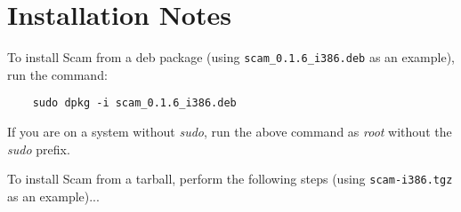 \documentclass{article}
\begin{document}
%
%


\section*{Installation Notes}

To install Scam from a deb package
(using {\tt scam\_0.1.6\_i386.deb} as an example), run the command:

\begin{verbatim}
    sudo dpkg -i scam_0.1.6_i386.deb
\end{verbatim}

If you are on a system without {\it sudo}, run the above command
as {\it root} without the {\it sudo} prefix.

To install Scam from a tarball, perform the following steps
(using {\tt scam-i386.tgz} as an example)...
\end{document}
